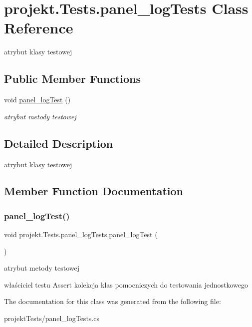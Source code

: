 \hypertarget{classprojekt_1_1_tests_1_1panel__log_tests}{}\section{projekt.\+Tests.\+panel\+\_\+log\+Tests Class Reference}
\label{classprojekt_1_1_tests_1_1panel__log_tests}


atrybut klasy testowej  


\subsection*{Public Member Functions}
\begin{DoxyCompactItemize}
\item 
void \mbox{\hyperlink{classprojekt_1_1_tests_1_1panel__log_tests_acd1fb478675bc744fb08dcbbce12bf26}{panel\+\_\+log\+Test}} ()
\begin{DoxyCompactList}\small\item\em atrybut metody testowej \end{DoxyCompactList}\end{DoxyCompactItemize}


\subsection{Detailed Description}
atrybut klasy testowej 

\subsection{Member Function Documentation}
\mbox{\label{classprojekt_1_1_tests_1_1panel__log_tests_acd1fb478675bc744fb08dcbbce12bf26}} 
\subsubsection{\texorpdfstring{panel\+\_\+log\+Test()}{panel\_logTest()}}
{\footnotesize\ttfamily void projekt.\+Tests.\+panel\+\_\+log\+Tests.\+panel\+\_\+log\+Test (\begin{DoxyParamCaption}{ }\end{DoxyParamCaption})\hspace{0.3cm}{\ttfamily [inline]}}



atrybut metody testowej 

właściciel testu Assert kolekcja klas pomocniczych do testowania jednostkowego 

The documentation for this class was generated from the following file\+:\begin{DoxyCompactItemize}
\item 
projekt\+Tests/panel\+\_\+log\+Tests.\+cs\end{DoxyCompactItemize}
